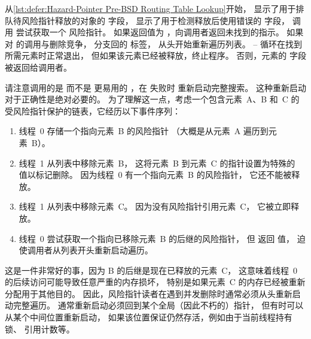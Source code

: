 \begin{fcvref}
从\cref{lst:defer:Hazard-Pointer Pre-BSD Routing Table Lookup}开始，
显示了用于排队待风险指针释放的对象的  字段，
显示了用于检测释放后使用错误的  字段，
调用  尝试获取一个 风险指针。
如果返回值为 ，向调用者返回未找到的指示。
如果对  的调用与删除竞争，
分支回的  标签，
从头开始重新遍历列表。
-- 循环在找到所需元素时正常退出，
但如果该元素已经被释放，终止程序。
否则，元素的  字段被返回给调用者。

请注意调用的是  而不是
更易用的 ，在  失败时
重新启动完整搜索。
这种重新启动对于正确性是绝对必要的。
为了理解这一点，考虑一个包含元素~A、B 和~C 的
受风险指针保护的链表，它经历以下事件序列：
\end{fcvref}

\begin{enumerate}
\item	线程~0 存储一个指向元素~B 的风险指针
	（大概是从元素~A 遍历到元素~B）。
\item	线程~1 从列表中移除元素~B，
	这将元素~B 到元素~C 的指针设置为特殊的
	 值以标记删除。
	因为线程~0 有一个指向元素~B 的风险指针，
	它还不能被释放。
\item	线程~1 从列表中移除元素~C。
	因为没有风险指针引用元素~C，
	它被立即释放。
\item	线程~0 尝试获取一个指向已移除元素~B 的后继的风险指针，
	但  返回  值，
	迫使调用者从列表开头重新启动遍历。
\end{enumerate}

这是一件非常好的事，因为 B 的后继是现在已释放的元素~C，
这意味着线程~0 的后续访问可能导致任意严重的内存损坏，
特别是如果元素~C 的内存已经被重新分配用于其他目的。
因此，风险指针读者在遇到并发删除时通常必须从头重新启动完整遍历。
通常重新启动必须回到某个全局（因此不朽的）指针，
但有时可以从某个中间位置重新启动，
如果该位置保证仍然存活，例如由于当前线程持有锁、
引用计数等。

\QuickQuizEnd

